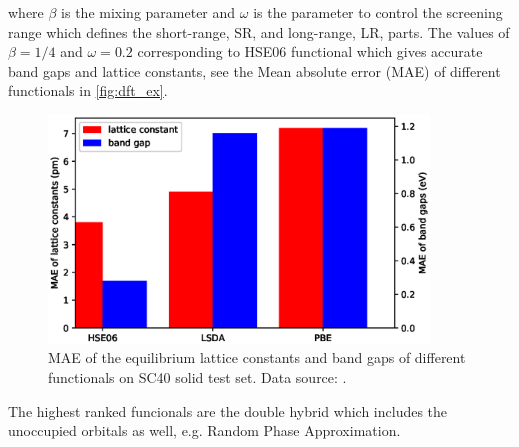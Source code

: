 where $\beta$ is the mixing parameter and $\omega$ is the parameter to control the screening range which defines the short-range, SR, and long-range, LR, parts. The values of $\beta=1/4$ and $\omega=0.2$ corresponding to HSE06 functional which gives accurate band gaps and lattice constants, see the Mean absolute error (MAE) of different functionals in \autoref{fig:dft_ex}. 
\begin{figure}[htbp!] 
\centering  
\includegraphics[width=0.9\textwidth]{lat_ex.eps}
\caption{ MAE of the equilibrium lattice constants and band gaps of different functionals on SC40 solid test set. Data source: \cite{Lucero2012}.}  
\label{fig:dft_ex}
\end{figure} 
The highest ranked funcionals are the double hybrid which includes the unoccupied orbitals as well, e.g. Random Phase Approximation\cite{Langreth1980}. 
